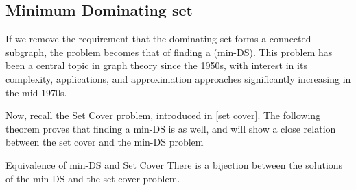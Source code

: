 \documentclass[a4paper, 12pt]{report}
\begin{document}
    \subsection{Minimum Dominating set}

    If we remove the requirement that the dominating set forms a connected subgraph, the problem becomes that of finding a  (min-DS). This problem has been a central topic in graph theory since the 1950s, with interest in its complexity, applications, and approximation approaches significantly increasing in the mid-1970s.

    Now, recall the \NPComplete Set Cover problem, introduced in \cref{set cover}. The following theorem proves that finding a min-DS is \NPComplete as well, and will show a close relation between the set cover and the min-DS problem

    \begin{framedthm}{Equivalence of min-DS and Set Cover}
        There is a bijection between the solutions of the min-DS and the set cover problem.
    \end{framedthm}
\end{document}
